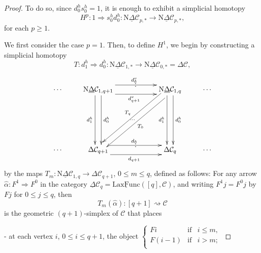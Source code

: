 \documentclass[]{amsart}
\begin{document}
\begin{proof}
To do so, since $d_0^hs_0^h=1$, it is enough to exhibit a simplicial homotopy
$$
H^p:1\Rightarrow s_0^hd_0^h:{\ensuremath{\mathrm{N}}}{\ensuremath{\underline{\Delta}}}{\ensuremath{\mathcal{C}}}_{p,*}\to{\ensuremath{\mathrm{N}}}{\ensuremath{\underline{\Delta}}}{\ensuremath{\mathcal{C}}}_{p,*},
$$
for each $p\geq 1$.

We first consider the case $p=1$. Then, to define $H^1$, we begin by constructing a simplicial
homotopy
\begin{equation}\label{1.2.28}
T:d_1^h\Rightarrow d_0^h: {\ensuremath{\mathrm{N}}}{\ensuremath{\underline{\Delta}}}{\ensuremath{\mathcal{C}}}_{1,*}\rightarrow {\ensuremath{\mathrm{N}}}{\ensuremath{\underline{\Delta}}}{\ensuremath{\mathcal{C}}}_{0,*}={\ensuremath{\Delta}}{\ensuremath{\mathcal{C}}},
\end{equation}
$$ \xymatrix{\cdots & {\ensuremath{\mathrm{N}}}{\ensuremath{\underline{\Delta}}}{\ensuremath{\mathcal{C}}}_{1,q+1} \ar@<1.5ex>[rr]^{d_0^v} \ar@<-1.5ex>[rr]_{d_{q+1}^v}
\ar@<1ex>[dd]^{d_0^h} \ar@<-1ex>[dd]_{d_1^h} & {}^{^{\vdots}} &
{\ensuremath{\mathrm{N}}}{\ensuremath{\underline{\Delta}}}{\ensuremath{\mathcal{C}}}_{1,q}\ar@<1ex>[dd]^{d_0^h} \ar@<-1ex>[dd]_{d_1^h}
\ar@<1ex>[ddll]^{T_0}_{\ \ \dots}\ar@<-1ex>[ddll]_{T_q} & \cdots \\
&&&&\\
\cdots & {\ensuremath{\Delta}}{\ensuremath{\mathcal{C}}}_{q+1} \ar@<1.5ex>[rr]^{d_0} \ar@<-1.5ex>[rr]_{d_{q+1}} &{}^{^{\vdots}}& {\ensuremath{\Delta}}{\ensuremath{\mathcal{C}}}_q
&
\cdots\\
}
$$
by the maps $T_m:{\ensuremath{\mathrm{N}}}{\ensuremath{\underline{\Delta}}}{\ensuremath{\mathcal{C}}}_{1,q}\to {\ensuremath{\Delta}}{\ensuremath{\mathcal{C}}}_{q+1}$, $0\leq m\leq q$, defined as follows: For any
arrow $\widehat{\alpha}:F^1\Rightarrow F^0$ in the category ${\ensuremath{\underline{\Delta}}}{\ensuremath{\mathcal{C}}}_q={\ensuremath{\underline{\mathrm{LaxFunc}}}}([q],{\ensuremath{\mathcal{C}}})$, and
writing $F^1j=F^0j$ by $Fj$  for $0\leq j\leq q$, then
$$T_m(\widehat{\alpha}):[q+1]\rightsquigarrow{\ensuremath{\mathcal{C}}}$$is  the geometric $(q+1)$-simplex of ${\ensuremath{\mathcal{C}}}$ that
places

\vspace{0.2cm}
\noindent - at each vertex $i$, $0\leq i\leq q+1$, the object $\left\{\begin{array}{lll}
    Fi & \text{if} & i\leq m, \\
    F(i-1) & \text{if} & i>m; \\
\end{array}\right. $


\end{proof}
\end{document}
